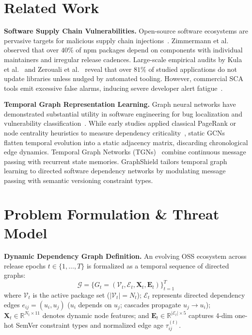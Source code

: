 \documentclass[sigconf,screen]{acmart}
\begin{document}
\section{Related Work}
\label{sec:related}

\noindent\textbf{Software Supply Chain Vulnerabilities.} Open-source software ecosystems are pervasive targets for malicious supply chain injections~\cite{ladisa2023soK, ohm2020backstabber}. Zimmermann et al.~\cite{zimmermann2019small} observed that over $40\%$ of npm packages depend on components with individual maintainers and irregular release cadences. Large-scale empirical audits by Kula et al.~\cite{kula2018empirical} and Zerouali et al.~\cite{zerouali2021multi} reveal that over $81\%$ of studied applications do not update libraries unless nudged by automated tooling. However, commercial SCA tools emit excessive false alarms, inducing severe developer alert fatigue~\cite{alfadel2021empirical, pashchenko2020qualitative}.

\noindent\textbf{Temporal Graph Representation Learning.} Graph neural networks have demonstrated substantial utility in software engineering for bug localization and vulnerability classification~\cite{allamanis2018learning, he2023graph}. While early studies applied classical PageRank or node centrality heuristics to measure dependency criticality~\cite{pashchenko2020qualitative}, static GCNs~\cite{velickovic2018graph} flatten temporal evolution into a static adjacency matrix, discarding chronological edge dynamics. Temporal Graph Networks (TGNs)~\cite{rossi2020temporal, kumar2019predicting} combine continuous message passing with recurrent state memories. GraphShield tailors temporal graph learning to directed software dependency networks by modulating message passing with semantic versioning constraint types.

\section{Problem Formulation \& Threat Model}
\label{sec:formulation}

\noindent\textbf{Dynamic Dependency Graph Definition.} An evolving OSS ecosystem across release epochs $t \in \{1, \dots, T\}$ is formalized as a temporal sequence of directed graphs:
\begin{equation}
    \mathcal{G} = \{G_t = (\mathcal{V}_t, \mathcal{E}_t, \mathbf{X}_t, \mathbf{E}_t)\}_{t=1}^T
\end{equation}
where $\mathcal{V}_t$ is the active package set ($|\mathcal{V}_t| = N_t$); $\mathcal{E}_t$ represents directed dependency edges $e_{ij} = (u_i, u_j)$ ($u_i$ depends on $u_j$; cascades propagate $u_j \to u_i$); $\mathbf{X}_t \in \mathbb{R}^{N_t \times 11}$ denotes dynamic node features; and $\mathbf{E}_t \in \mathbb{R}^{|\mathcal{E}_t| \times 5}$ captures 4-dim one-hot SemVer constraint types and normalized edge age $\tau_{ij}^{(t)}$.
\end{document}

